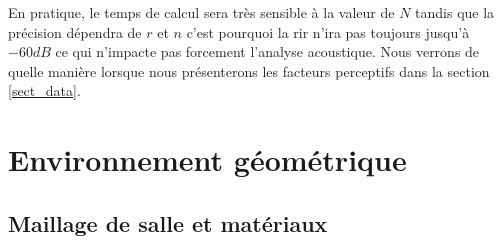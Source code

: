 En pratique, le temps de calcul sera très sensible à la valeur de $N$ tandis que la précision dépendra de $r$ et $n$ c'est pourquoi la \gls{rir} n'ira pas toujours jusqu'à $-60dB$ ce qui n'impacte pas forcement l'analyse acoustique. Nous verrons de quelle manière lorsque nous présenterons les facteurs perceptifs dans la section \ref{sect_data}.















\section{Environnement géométrique}

\subsection{Maillage de salle et matériaux} \label{sect_lectMat}

